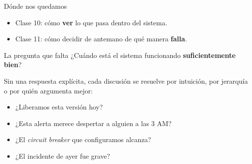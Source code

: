\documentclass[institutional,screen,none]{ua-engineering-v6-beamer}
\title{\UACourse}
\subtitle{Clase 12 --- SLOs, error budgets, experimentos bajo falla, incidentes y postmortems}
\author{\UAProfessor}
\date{\UADate}
\begin{document}
{
\begin{frame}[plain]
\titlepage
\end{frame}
}

\newcommand{\generadordiagram}[1]{%
\begin{center}
\begin{tikzpicture}[
  scale=0.80, transform shape,
  every node/.style={font=\scriptsize},
  box/.style={draw=UAIngNavy, fill=white, rounded corners, minimum width=1.9cm, minimum height=0.55cm},
  flow/.style={-{Stealth[length=1.6mm]}, draw=UAIngNavy}
]
\node[box] (u) at (0,0) {Usuario};
\node[box] (g) at (3.4,0) {Generador};
\node[box] (up) at (7.6,1.5) {\emph{mayúsculas}};
\node[box] (lo) at (7.6,0.5) {\emph{minúsculas}};
\node[box] (di) at (7.6,-0.5) {\emph{dígitos}};
\node[box] (sp) at (7.6,-1.5) {\emph{especiales}};
\draw[flow] (u) -- node[above]{solicitud} (g);
\draw[flow] (g) -- (up.west);
\draw[flow] (g) -- (lo.west);
\draw[flow] (g) -- (di.west);
\draw[flow] (g) -- (sp.west);
#1
\end{tikzpicture}
\end{center}
}


\begin{frame}{Dónde nos quedamos}
\begin{itemize}
\item Clase 10: cómo \textbf{ver} lo que pasa dentro del sistema.
\item Clase 11: cómo decidir de antemano de qué manera \textbf{falla}.
\end{itemize}

\pause

\begin{block}{La pregunta que falta}
¿Cuándo está el sistema funcionando \textbf{suficientemente bien}?
\end{block}

\pause

Sin una respuesta explícita, cada discusión se resuelve por intuición, por jerarquía o por quién argumenta mejor:
\begin{itemize}\small
\item ¿Liberamos esta versión hoy?
\item ¿Esta alerta merece despertar a alguien a las 3 AM?
\item ¿El \emph{circuit breaker} que configuramos alcanza?
\item ¿El incidente de ayer fue grave?
\end{itemize}
\end{frame}
\end{document}
